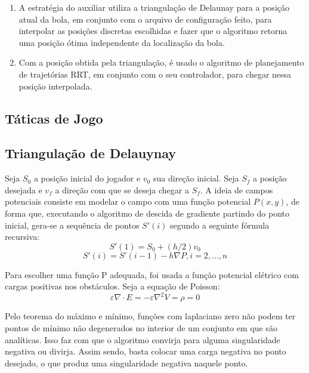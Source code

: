 \documentclass[a4paper,12pt]{article}
\begin{document}
\begin{enumerate}
\item A estratégia do auxiliar utiliza a triangulação de Delaunay para a posição atual da bola, em conjunto com o arquivo de configuração feito, para interpolar as posições discretas escolhidas e fazer que o algoritmo retorna uma posição ótima independente da localização da bola.

\item Com a posição obtida pela triangulação, é usado o algoritmo de planejamento de trajetórias RRT, em conjunto com o seu controlador, para chegar nessa posição interpolada.

\end{enumerate}

\subsection{Táticas de Jogo}


\subsection{Triangulação de Delauynay}



Seja $S_{0}$ a posição inicial do jogador e $v_{0}$ sua direção inicial. Seja $S_{f}$ a posição desejada e $v_{f}$ a direção com que se deseja chegar a $S_{f}$. A ideia de campos potenciais consiste em modelar o campo com uma função potencial $P(x,y)$, de forma que, executando o algoritmo de descida de gradiente partindo do ponto inicial, gera-se a sequência de pontos $S'(i)$ segundo a seguinte fórmula recursiva:
\begin{equation}
S'(1) = S_{0} + (h/2)v_{0}
\end{equation}
\begin{equation}
S'(i) = S'(i-1) - h\nabla P, i = 2,...,n
\end{equation}

Para escolher uma função P adequada, foi usada a função potencial elétrico com cargas positivas nos obstáculos. Seja a equação de Poisson:
\begin{equation}
\varepsilon \nabla \cdot E = -\varepsilon \nabla ^2 V=\rho = 0
\end{equation}

Pelo teorema do máximo e mínimo, funções com laplaciano zero não podem ter pontos de mínimo não degenerados no interior de um conjunto em que são analíticas. Isso faz com que o algoritmo convirja para alguma singularidade negativa ou divirja. Assim sendo, basta colocar uma carga negativa no ponto desejado, o que produz uma singularidade negativa naquele ponto.
\end{document}

